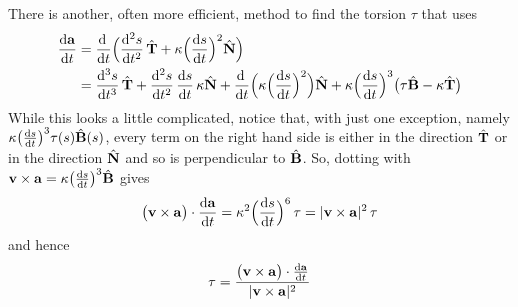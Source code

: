 There is another, often more efficient, method to find the torsion $\tau$ 
that uses
\begin{align*}
\diff{\va}{t} &= \diff{}{t}\Big(\difftwo{s}{t}\,\hat\vT
                             +\ka\Big(\diff{s}{t}\Big)^2\hat\vN\Big) \\
       &= \ddiff{3}{s}{t}\,\hat\vT
         +\difftwo{s}{t}\,\diff{s}{t}\,\ka\hat\vN
         +\diff{}{t}\Big(\ka\Big(\diff{s}{t}\Big)^2\Big)\hat\vN
         +\ka\Big(\diff{s}{t}\Big)^3
               \big(\tau\hat\vB-\ka\hat\vT\big)
\end{align*}
While this looks a little complicated, notice that, with just 
one exception, namely 
$\ka\big(\diff{s}{t}\big)^3\tau(s)\hat\vB(s)$, every term on the right 
hand side is either in the direction $\hat{\mathbf{T}}$ or in the direction 
$\hat{\mathbf{N}}$ and so is perpendicular to $\hat{\mathbf{B}}$. So, dotting with 
$\vv\times\va = \ka \big(\diff{s}{t}\big)^3\hat\vB$ gives
\begin{align*}
\big(\vv\times\va\big)\cdot \diff{\va}{t} 
   = \ka^2 \Big(\diff{s}{t}\Big)^6\,\tau
   = |\vv\times\va|^2\,\tau
\end{align*}
and hence
\begin{align*}
\tau = \frac{\big(\vv\times\va\big)\cdot \diff{\va}{t} }{|\vv\times\va|^2}
\end{align*}


